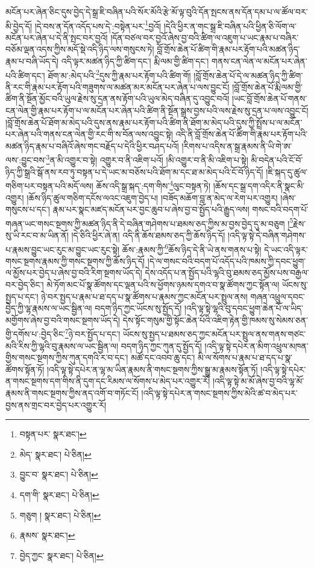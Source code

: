 མངོན་པར་ཞེན་ཅིང་དུས་བྱེད་དེ་སྒྲ་ཇི་བཞིན་པའི་སོར་མོའི་རྩེ་མོ་ལྟ་བུའི་དོན་སྤངས་ནས་དོན་དམ་པ་ལ་ཚོལ་བར་མི་བྱེད་དོ། །དེ་བས་ན་དོན་འདོད་པས་དེ་:བསྟེན་པར་\footnote{བསྟན་པར་  སྣར་ཐང་། }བྱའོ། །དེའི་ཕྱིར་ན་གང་སྒྲ་ཇི་བཞིན་པའི་ཕྱིན་ཅི་ལོག་ལ་མངོན་པར་ཞེན་པ་དེ་ནི་སྤང་བར་བྱའོ། །དོན་བཙལ་བར་བྱའོ་ཞེས་བྱ་བའི་ཚིག་ལ་འཇུག་པ་ཡང་རྣམ་པ་བཞིར་བཅོམ་ལྡན་འདས་ཀྱིས་མདོ་སྡེ་འདི་ཉིད་ལས་གསུངས་ཏེ། བློ་གྲོས་ཆེན་པོ་ཚིག་གི་རྣམ་པར་རྟོག་པའི་མཚན་ཉིད་རྣམ་པ་བཞི་ཡོད་དེ། འདི་ལྟར་མཚན་ཉིད་ཀྱི་ཚིག་དང་། རྨི་ལམ་གྱི་ཚིག་དང་། གནས་ངན་ལེན་ལ་མངོན་པར་ཞེན་པའི་ཚིག་དང་། ཐོག་མ་:མེད་པའི་\footnote{མེད་  སྣར་ཐང་།  པེ་ཅིན། }དུས་ཀྱི་རྣམ་པར་རྟོག་པའི་ཚིག་གོ། །བློ་གྲོས་ཆེན་པོ་དེ་ལ་མཚན་ཉིད་ཀྱི་ཚིག་ནི་རང་གི་རྣམ་པར་རྟོག་པའི་གཟུགས་ལ་མཚན་མར་མངོན་པར་ཞེན་པ་ལས་བྱུང་ངོ། །བློ་གྲོས་ཆེན་པོ་རྨི་ལམ་གྱི་ཚིག་ནི་སྔོན་མྱོང་བའི་ཡུལ་རྗེས་སུ་དྲན་ནས་རྟོག་པའི་ཡུལ་མེད་བཞིན་དུ་འབྱུང་བའོ། །ཡང་བློ་གྲོས་ཆེན་པོ་གནས་ངན་ལེན་གྱི་རྣམ་པར་རྟོག་པ་ལ་མངོན་པར་ཞེན་པའི་ཚིག་ནི་སྔོན་སྒྲས་བྱས་པའི་ལས་རྗེས་སུ་དྲན་པ་ལས་འབྱུང་ངོ། །བློ་གྲོས་ཆེན་པོ་ཐོག་མ་མེད་པའི་དུས་ནས་རྣམ་པར་རྟོག་པའི་ཚིག་ནི་ཐོག་མ་མེད་པའི་དུས་ཀྱི་སྤྲོས་པ་ལ་མངོན་པར་ཞེན་པའི་གནས་ངན་ལེན་གྱི་རང་གི་ས་བོན་ལས་འབྱུང་སྟེ། འདི་ནི་བློ་གྲོས་ཆེན་པོ་ཚིག་གི་རྣམ་པར་རྟོག་པའི་མཚན་ཉིད་རྣམ་པ་བཞིའོ་ཞེས་གང་བརྗོད་པ་དེའི་ཕྱིར་བཤད་པའོ། །རིགས་པ་འདིས་ན་སྒྲ་རྣམས་ནི་ཡི་གེ་ཨ་ལས་:བྱུང་བས་\footnote{བྱུང་བ་  སྣར་ཐང་།  པེ་ཅིན། }ན་མི་འགྱུར་བ་སྟེ། འགྱུར་བ་ནི་འཇིག་པའོ། །མི་འགྱུར་བ་ནི་མི་འཇིག་པ་སྟེ། མི་བདེན་པའི་ངོ་བོ་ཉིད་ཀྱི་སྒྲའི་སྒོ་ནས་རབ་ཏུ་བསྟན་པ་དེ་ཡང་མ་བཅོས་པའི་ཐོག་མ་དང་ཐ་མ་མེད་པའི་ངོ་བོ་ཉིད་དོ། །ཇི་སྐད་དུ་ཚུལ་གཅིག་པར་བསྟན་པའི་མདོ་ལས། ཆོས་འདི་སྒྲ་སྐད་:དག་གིས་\footnote{དག་གི་  སྣར་ཐང་།  པེ་ཅིན། }ལུང་བསྟན་ཏེ། །ཆོས་དང་སྒྲ་དག་འདིར་ནི་སྣང་མི་འགྱུར། །ཆོས་ཉིད་ཚུལ་གཅིག་དངོས་ལའང་འཇུག་བྱེད་པ། །བཟོད་མཆོག་བླ་ན་མེད་ལ་རེག་པར་འགྱུར། །ཞེས་གསུངས་པ་དང་། རྣམ་པར་སྣང་མཛད་མངོན་པར་བྱང་ཆུབ་པ་ཞེས་བྱ་བ་སྤྱོད་པའི་རྒྱུད་ལས། གསང་བའི་བདག་པོ་གཞན་ཡང་གསང་སྔགས་ཀྱི་མཚན་ཉིད་ནི་དེ་བཞིན་གཤེགས་པ་ཐམས་ཅད་ཀྱིས་མ་བྱས་བྱེད་དུ་མ་བཅུག །\footnote{གཅུག །  སྣར་ཐང་།  པེ་ཅིན། }རྗེས་སུ་ཡི་རང་བ་མ་ཡིན་ནོ། །དེ་ཅིའི་ཕྱིར་ཞེ་ན། འདི་ནི་ཆོས་ཐམས་ཅད་ཀྱི་ཆོས་ཉིད་དོ། །འདི་ལྟ་སྟེ་དེ་བཞིན་གཤེགས་པ་རྣམས་བྱུང་ཡང་རུང་མ་བྱུང་ཡང་རུང་སྟེ། ཆོས་:རྣམས་ཀྱི་\footnote{རྣམས་  སྣར་ཐང་། }ཆོས་ཉིད་དེ་ནི་ཡེ་ནས་གནས་པ་སྟེ། དེ་ཡང་འདི་ལྟར་གསང་སྔགས་རྣམས་ཀྱི་གསང་སྔགས་ཀྱི་ཆོས་ཉིད་དོ། །དེ་ལ་གསང་བའི་བདག་པོ་འདོད་པའི་ཁམས་ཀྱི་དབང་ཕྱུག་ལ་མྱོས་པར་བྱེད་པ་ཞེས་བྱ་བའི་རིག་སྔགས་ཡོད་དེ། དེས་འདོད་པ་ན་སྤྱོད་པའི་ལྷའི་བུ་ཐམས་ཅད་མྱོས་པས་བརྒྱལ་བར་བྱེད་ཅིང་། མེ་ཏོག་མང་པོ་སྣ་ཚོགས་དང་ལྡན་པའི་ས་ཕྱོགས་ཉམས་དགའ་བ་སྣ་ཚོགས་ཀྱང་སྟོན་ལ། ཡོངས་སུ་སྤྱད་པ་དང་། ཉེ་བར་སྤྱད་པ་རྣམ་པ་ཐ་དད་པ་སྣ་ཚོགས་པ་རྣམས་ཀྱང་མངོན་པར་སྤྲུལ་ནས། གཞན་འཕྲུལ་དབང་བྱེད་ཀྱི་ལྷ་རྣམས་ལ་ཡང་སྦྱིན་ལ། བདག་ཉིད་ཀྱང་ཡོངས་སུ་སྤྱོད་དོ། །འདི་ལྟ་སྟེ་ལྷའི་བུ་དབང་ཕྱུག་ཆེན་པོ་ལ་ཡིད་མགྱོགས་ཞེས་བྱ་བའི་གསང་སྔགས་ཡོད་དེ། དེས་སྟོང་གསུམ་གྱི་སྟོང་ཆེན་པོའི་འཇིག་རྟེན་གྱི་ཁམས་སུ་སེམས་ཅན་གྱི་དགོས་པ་:བྱེད་ཅིང་\footnote{བྱེད་ཀྱང་  སྣར་ཐང་།  པེ་ཅིན། }ཉེ་བར་སྤྱོད་པ་དང་། ཡོངས་སུ་སྤྱད་པ་ཐམས་ཅད་ཀྱང་མངོན་པར་སྤྲུལ་ནས་གནས་གཙང་མའི་རིས་ཀྱི་ལྷའི་བུ་རྣམས་ལ་ཡང་སྦྱིན་ལ། བདག་ཉིད་ཀྱང་ཀུན་དུ་སྤྱོད་དོ། །འདི་ལྟ་སྟེ་དཔེར་ན་མིག་འཕྲུལ་མཁན་གྱིས་གསང་སྔགས་ཀྱིས་ཀུན་དགའི་ར་བ་དང་། མཚོ་དང་འབབ་ཆུ་དང་། མི་ལ་སོགས་པ་རྣམ་པ་ཐ་དད་པ་སྣ་ཚོགས་སྟོན་ཏོ། །འདི་ལྟ་སྟེ་དཔེར་ན་ལྷ་མ་ཡིན་རྣམས་ནི་གསང་སྔགས་ཀྱིས་སྒྱུ་མ་རྣམས་སྟོན་ཏོ། །འདི་ལྟ་སྟེ་དཔེར་ན་གསང་སྔགས་དག་གིས་ནི་དུག་དང་རིམས་ལ་སོགས་པ་མེད་པར་འགྱུར་རོ། །འདི་ལྟ་སྟེ་མ་མོ་ཞེས་བྱ་བའི་ལྷ་མོ་རྣམས་ནི་གསང་སྔགས་ཀྱིས་ནད་འགོ་བ་གཏོང་ངོ། །འདི་ལྟ་སྟེ་དཔེར་ན་གསང་སྔགས་ཀྱིས་མེའི་ཚ་བ་མེད་པར་བྱས་ནས་གྲང་བར་བྱེད་པར་འགྱུར་རོ། 